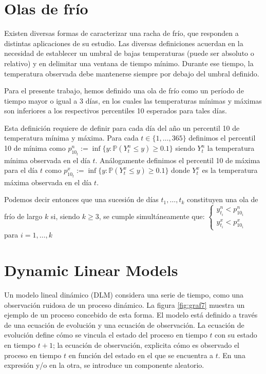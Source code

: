 \documentclass{article}
\newcommand{\p}{\mathbb{P}}
\begin{document}
\section{Olas de frío}

Existen diversas formas de caracterizar una racha de frío, que responden a distintas aplicaciones de su estudio. Las diversas definiciones acuerdan en la necesidad de establecer un umbral de bajas temperaturas (puede ser absoluto o relativo) y en delimitar una ventana de tiempo mínimo. Durante ese tiempo, la temperatura observada debe mantenerse siempre por debajo del umbral definido.

Para el presente trabajo, hemos definido una ola de frío como un período de tiempo mayor o igual a 3 días, en los cuales las temperaturas mínimas y máximas son inferiores a los respectivos percentiles 10 esperados para tales días.

Esta definición requiere de definir para cada día del año un percentil 10 de temperatura mínima y máxima. Para cada $t \in \{1,\dots, 365\}$ definimos el percentil 10 de mínima como $p^n_{10_t}:= \inf\{y: \p(Y^n_t \leq y)\geq 0.1\}$ siendo $Y^n_t$ la temperatura mínima observada en el día $t$. Análogamente definimos el percentil 10 de máxima para el día $t$ como $p^x_{10_t}:= \inf\{y: \p(Y^x_t \leq y)\geq 0.1\}$ donde $Y^x_t$ es la temperatura máxima observada en el día $t$.

Podemos decir entonces que una sucesión de días $t_1, \dots, t_k$ constituyen una ola de frío de largo $k$ si, siendo $k\geq 3$, se cumple simultáneamente que:
$\begin{cases} y^n_{t_i} < p^n_{10_i}  \\ y^x_{t_i} < p^x_{10_i} \end{cases}$ para $i=1,\dots,k$

\section{Dynamic Linear Models}

%

Un modelo lineal dinámico (DLM) considera una serie de tiempo, como una observación ruidosa de un proceso dinámico. La figura \ref{fig:graf7} muestra un ejemplo de un proceso concebido de esta forma. El modelo está definido a través de una ecuación de evolución y una ecuación de observación. La ecuación de evolución define cómo se vincula el estado del proceso en tiempo $t$ con su estado en tiempo $t+1$; la ecuación de observación, explicita cómo es observado el proceso en tiempo $t$ en función del estado en el que se encuentra a $t$. En una expresión y/o en la otra, se introduce un componente aleatorio.
\end{document}
